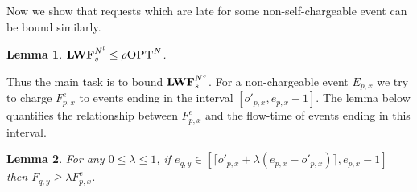 \documentclass[11pt]{article}
\newtheorem{lemma}{Lemma}[section]
\newcommand{\opt}{\textrm{\sc OPT}}
\newcommand{\len}{\mathfrak{\rho}}
\newcommand{\ceil}[1]{\lceil #1 \rceil}
\newcommand{\fe}{F^e}
\newcommand{\lwfne}{\lwf^{N^e}}
\newcommand{\lwfnl}{\lwf^{N^l}}
\newcommand{\optn}{\opt^{N}}
\begin{document}
\begin{titlepage}
Now we show that requests which are late for some non-self-chargeable
event can be bound similarly.

\fi

\begin{lemma}
\label{lem:NSCl}
 $\lwfnl_s \leq \len  \optn$.
\end{lemma}
\iffalse
\begin{proof}
  Consider an event $E_{p,x}$. First consider the case where $e_{p,x}
  - o_{p,x} \geq \len$. Recall that $o'_{p,x} = o_{p,x}$ by
  definition. Because $\opt$ did not broadcast page $p$ during
  $[o_{p,x}, e_{p,x})$, $\opt$ has the same wait time as $\lwf$ for
  the requests which arrived on the interval $[o'_{p,x} = o_{p,x},
  e_{p,x})$ for page $p$. If $e_{p,x} - o_{p,x} < \len$, then
  $o'_{p,x} =e_{p,x} - \len$. Any request which arrived during
  $[o'_{p,x}, e_{p,x})$ for page $p$ will be satisfied within $\len$
  time steps, hence waiting at most $\len$ times as long as
  $\opt$. Summing over requests finishes the proof.
\end{proof}

\textbf{(Another Alternate Short Proof of Lemma 2.1, and 2.2: Start)}

Lemma~\ref{lem:SC} and Lemma~\ref{lem:NSCl} can be shown by observing
any request of self-chargeable events or late request of
non-self-chargeable events is satisfied at the same time as OPT or is
satisfied within $\len$.

\textbf{(Another Alternate Short Proof of Lemma 2.1, and 2.2:End)}

The only requests which have yet to be bound are those that are early
for non-self-chargeable events.  For a non-self-chargeable event, we
want to charge the early requests' flow time to events ending during
the non-self-chargeable event. To do this, we show in the next lemma
that the flow time accumulated for the early requests of some
non-self-chargeable event is comparable to the flow time of any event
ending during the non-self-chargeable event.

\fi

Thus the main task is to bound $\lwfne_s$. For a non-chargeable event
$E_{p,x}$ we try to charge $\fe_{p,x}$ to events ending in the interval
$[o'_{p,x}, e_{p,x}-1]$. The lemma below quantifies the relationship
between $\fe_{p,x}$ and the flow-time of events ending in this interval.

\begin{lemma}
  \label{lem:close} For any $0 \leq \lambda \leq 1$, if $e_{q,y} \in
  [\ceil{o'_{p,x} + \lambda (e_{p,x} - o'_{p,x})}, e_{p,x}-1]$ then $F_{q,y}
  \geq \lambda \fe_{p,x}$.
\end{lemma}


\end{titlepage}
\end{document}
